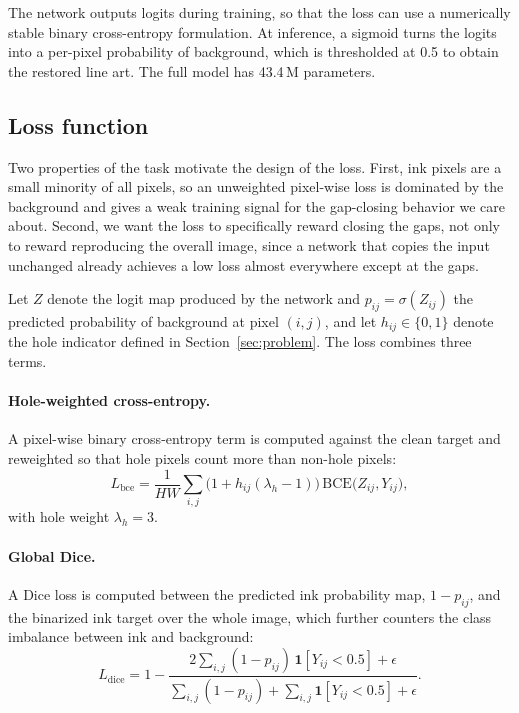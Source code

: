 \documentclass[pdflatex,sn-mathphys-num]{sn-jnl}%
\begin{document}
The network outputs logits during training, so that the loss can use a numerically
stable binary cross-entropy formulation. At inference, a sigmoid turns the logits
into a per-pixel probability of background, which is thresholded at 0.5 to obtain
the restored line art. The full model has 43.4\,M parameters.

\subsection{Loss function}

Two properties of the task motivate the design of the loss. First, ink pixels are a
small minority of all pixels, so an unweighted pixel-wise loss is dominated by the
background and gives a weak training signal for the gap-closing behavior we care
about. Second, we want the loss to specifically reward closing the gaps, not only
to reward reproducing the overall image, since a network that copies the input
unchanged already achieves a low loss almost everywhere except at the gaps.

Let $Z$ denote the logit map produced by the network and $p_{ij} = \sigma(Z_{ij})$ the predicted probability of background at pixel $(i,j)$, and let $h_{ij} \in \{0,1\}$ denote the hole indicator defined in Section~\ref{sec:problem}. The loss combines three terms.

\paragraph{Hole-weighted cross-entropy.} A pixel-wise binary cross-entropy term is
computed against the clean target and reweighted so that hole pixels count more
than non-hole pixels:
\begin{equation}
  L_{\mathrm{bce}} = \frac{1}{HW} \sum_{i,j} \bigl(1 + h_{ij}(\lambda_h - 1)\bigr)
  \,\mathrm{BCE}\bigl(Z_{ij}, Y_{ij}\bigr),
\end{equation}
with hole weight $\lambda_h = 3$.

\paragraph{Global Dice.} A Dice loss \citep{milletari2016vnet} is computed between
the predicted ink probability map, $1 - p_{ij}$, and the binarized ink target over
the whole image, which further counters the class imbalance between ink and
background:
\begin{equation}
  L_{\mathrm{dice}} = 1 - \frac{2 \sum_{i,j} (1-p_{ij})\, \mathbf{1}[Y_{ij}<0.5] + \epsilon}
  {\sum_{i,j} (1-p_{ij}) + \sum_{i,j} \mathbf{1}[Y_{ij}<0.5] + \epsilon}.
\end{equation}
\end{document}
